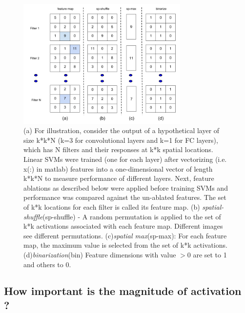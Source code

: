 \documentclass[runningheads]{llncs}
\begin{document}
\begin{figure}[t!]
\centering
\includegraphics[height=6.5cm]{images/features1.png}
\caption{(a) For illustration, consider the output of a hypothetical layer of size k*k*N (k=3 for convolutional layers and k=1 for FC layers), which has N filters and their responses at k*k spatial locations. Linear SVMs were trained (one for each layer) after vectorizing (i.e. x(:) in matlab) features into a one-dimensional vector of length k*k*N to measure performance of different layers. Next, feature ablations as described below were applied before training SVMs and performance was compared against the un-ablated features. The set of k*k locations for each filter is called its feature map. (b) \textit{spatial-shuffle}(sp-shuffle) -  A random permutation is applied to the set of k*k activations associated with each feature map. Different images see different permutations. (c)\textit{spatial max}(sp-max): For each feature map, the maximum value is selected from the set of k*k activations. (d)\textit{binarization}(bin) Feature dimensions with value $>0$ are set to 1 and others to 0.}
\label{fig:features}
\end{figure}

\subsection{How important is the magnitude of activation ?}
\label{sub:imp-mag}
\setlength{\tabcolsep}{2pt}
\begin{table}[t!]
\begin{center}
\caption{Percentage non-zeros (sparsity) in features of various layers of CNN.}
\label{table:sparse}
\end{center}
\end{table}
\setlength{\tabcolsep}{1.4pt}
\end{document}
